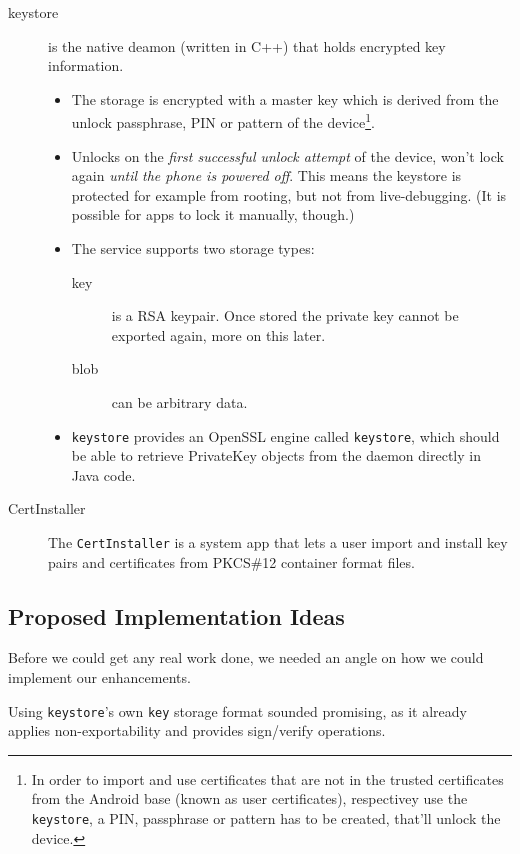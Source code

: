 \documentclass[a4paper,draft]{scrartcl}
\begin{document}
\begin{description}
			\item[keystore] is the native deamon (written in C++) that holds encrypted key information.
				\begin{itemize}
					\item The storage is encrypted with a master key which is derived from the unlock passphrase, PIN or pattern of the device\footnote{In order to import and use certificates that are not in the trusted certificates from the Android base (known as user certificates), respectivey use the \texttt{keystore}, a PIN, passphrase or pattern has to be created, that'll unlock the device.}.
					\item Unlocks on the \emph{first successful unlock attempt} of the device, won't lock again \emph{until the phone is powered off}. This means the keystore is protected for example from rooting, but not from live-debugging. (It is possible for apps to lock it manually, though.)
					\item The service supports two storage types:
					\begin{description}
						\item[key] is a RSA keypair. Once stored the private key cannot be exported again, more on this later.
						\item[blob] can be arbitrary data.
					\end{description}
					\item \texttt{keystore} provides an OpenSSL engine called \texttt{keystore}, which should be able to retrieve PrivateKey objects from the daemon directly in Java code.
				\end{itemize}
			\item [CertInstaller] The \texttt{CertInstaller} is a system app that lets a user import and install key pairs and certificates from PKCS\#12 container format files. %
		\end{description}



	\subsection{Proposed Implementation Ideas}
		Before we could get any real work done, we needed an angle on how we could implement our enhancements.

		Using \texttt{keystore}'s own \texttt{key} storage format sounded promising, as it already applies non-exportability and provides sign/verify operations.
\end{document}
